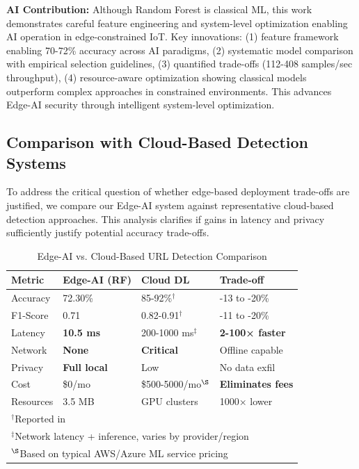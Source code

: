 \textbf{AI Contribution:} Although Random Forest is classical ML, this work demonstrates careful feature engineering and system-level optimization enabling AI operation in edge-constrained IoT. Key innovations: (1) feature framework enabling 70-72\% accuracy across AI paradigms, (2) systematic model comparison with empirical selection guidelines, (3) quantified trade-offs (112-408 samples/sec throughput), (4) resource-aware optimization showing classical models outperform complex approaches in constrained environments. This advances Edge-AI security through intelligent system-level optimization.

\subsection{Comparison with Cloud-Based Detection Systems}

To address the critical question of whether edge-based deployment trade-offs are justified, we compare our Edge-AI system against representative cloud-based detection approaches. This analysis clarifies if gains in latency and privacy sufficiently justify potential accuracy trade-offs.

\begin{table}[htbp]
\centering
{\footnotesize
\caption{Edge-AI vs. Cloud-Based URL Detection Comparison}
\label{tab:edge_vs_cloud}
\begin{tabular}{lp{2cm}p{2cm}p{2.2cm}}
\toprule
Metric & \textbf{Edge-AI (RF)} & \textbf{Cloud DL} & \textbf{Trade-off} \\
\midrule
Accuracy & 72.30\% & 85-92\%$^{\dagger}$ & -13 to -20\% \\
F1-Score & 0.71 & 0.82-0.91$^{\dagger}$ & -11 to -20\% \\
Latency & \textbf{10.5 ms} & 200-1000 ms$^{\ddagger}$ & \textbf{2-100× faster} \\
Network & \textbf{None} & \textbf{Critical} & Offline capable \\
Privacy & \textbf{Full local} & Low & No data exfil \\
Cost & \$0/mo & \$500-5000/mo$^{\S}$ & \textbf{Eliminates fees} \\
Resources & 3.5 MB & GPU clusters & 1000× lower \\
\bottomrule
\multicolumn{4}{l}{\scriptsize $^{\dagger}$Reported in \cite{ref_phishing_lstm_2023,ref_transformer_phish_2022,ref_url_gnn_2024}} \\
\multicolumn{4}{l}{\scriptsize $^{\ddagger}$Network latency + inference, varies by provider/region} \\
\multicolumn{4}{l}{\scriptsize $^{\S}$Based on typical AWS/Azure ML service pricing} \\
\end{tabular}
}
\end{table}

